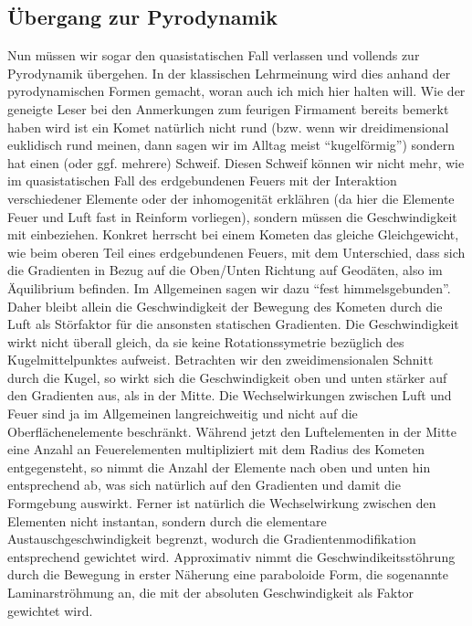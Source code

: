 \documentclass[a5paper,8pt]{book}
\begin{document}
\subsection{Übergang zur Pyrodynamik}

Nun müssen wir sogar den quasistatischen Fall verlassen und vollends zur Pyrodynamik übergehen. In der klassischen 
Lehrmeinung wird dies anhand der pyrodynamischen Formen gemacht, woran auch ich mich hier halten will.
Wie der geneigte Leser bei den Anmerkungen zum feurigen Firmament bereits bemerkt haben wird ist ein Komet natürlich nicht 
rund (bzw. wenn wir dreidimensional euklidisch rund meinen, dann sagen wir im Alltag meist “kugelförmig”) sondern hat einen 
(oder ggf. mehrere) Schweif. Diesen Schweif können wir nicht mehr, wie im quasistatischen Fall des erdgebundenen Feuers mit 
der Interaktion verschiedener Elemente oder der inhomogenität erklähren (da hier die Elemente Feuer und Luft fast in 
Reinform vorliegen), sondern müssen die Geschwindigkeit mit einbeziehen.
Konkret herrscht bei einem Kometen das gleiche Gleichgewicht, wie beim oberen Teil eines erdgebundenen Feuers, mit dem 
Unterschied, dass sich die Gradienten in Bezug auf die Oben/Unten Richtung auf Geodäten, also im Äquilibrium befinden. Im 
Allgemeinen sagen wir dazu “fest himmelsgebunden”.
Daher bleibt allein die Geschwindigkeit der Bewegung des Kometen durch die Luft als Störfaktor für die ansonsten statischen
Gradienten. Die Geschwindigkeit wirkt nicht überall gleich, da sie keine Rotationssymetrie bezüglich des Kugelmittelpunktes 
aufweist. Betrachten wir den zweidimensionalen Schnitt durch die Kugel, so wirkt sich die Geschwindigkeit oben und unten 
stärker auf den Gradienten aus, als in der Mitte. Die Wechselwirkungen zwischen Luft und Feuer sind ja im Allgemeinen 
langreichweitig und nicht auf die Oberflächenelemente beschränkt. Während jetzt den Luftelementen in der Mitte eine Anzahl 
an Feuerelementen multipliziert mit dem Radius des Kometen entgegensteht, so nimmt die Anzahl der Elemente nach oben und 
unten hin entsprechend ab, was sich natürlich auf den Gradienten und damit die Formgebung auswirkt. Ferner ist natürlich 
die Wechselwirkung zwischen den Elementen nicht instantan, sondern durch die elementare Austauschgeschwindigkeit begrenzt, 
wodurch die Gradientenmodifikation entsprechend 
gewichtet wird.
Approximativ nimmt die Geschwindikeitsstöhrung durch die Bewegung in erster Näherung eine paraboloide Form, die sogenannte 
Laminarströhmung an, die mit der absoluten Geschwindigkeit als Faktor gewichtet wird.
\end{document}
